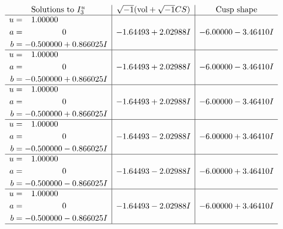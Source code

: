 \documentclass[1p]{elsarticle_modified}
\theoremstyle{definition}
\newcommand{\I}{\sqrt{-1}}
\begin{document}
$$\begin{array}{c|c|c}  
\text{Solutions to }I^u_{3}& \I (\text{vol} + \sqrt{-1}CS) & \text{Cusp shape}\\
 \hline 
\begin{aligned}
u &= \phantom{-}1.00000\phantom{ +0.000000I} \\
a &= \phantom{-0.000000 } 0 \\
b &= -0.500000 + 0.866025 I\end{aligned}
 & -1.64493 + 2.02988 I & -6.00000 - 3.46410 I \\ \hline\begin{aligned}
u &= \phantom{-}1.00000\phantom{ +0.000000I} \\
a &= \phantom{-0.000000 } 0 \\
b &= -0.500000 + 0.866025 I\end{aligned}
 & -1.64493 + 2.02988 I & -6.00000 - 3.46410 I \\ \hline\begin{aligned}
u &= \phantom{-}1.00000\phantom{ +0.000000I} \\
a &= \phantom{-0.000000 } 0 \\
b &= -0.500000 + 0.866025 I\end{aligned}
 & -1.64493 + 2.02988 I & -6.00000 - 3.46410 I \\ \hline\begin{aligned}
u &= \phantom{-}1.00000\phantom{ +0.000000I} \\
a &= \phantom{-0.000000 } 0 \\
b &= -0.500000 - 0.866025 I\end{aligned}
 & -1.64493 - 2.02988 I & -6.00000 + 3.46410 I \\ \hline\begin{aligned}
u &= \phantom{-}1.00000\phantom{ +0.000000I} \\
a &= \phantom{-0.000000 } 0 \\
b &= -0.500000 - 0.866025 I\end{aligned}
 & -1.64493 - 2.02988 I & -6.00000 + 3.46410 I \\ \hline\begin{aligned}
u &= \phantom{-}1.00000\phantom{ +0.000000I} \\
a &= \phantom{-0.000000 } 0 \\
b &= -0.500000 - 0.866025 I\end{aligned}
 & -1.64493 - 2.02988 I & -6.00000 + 3.46410 I\\
 \hline 
 \end{array}$$\newpage
\end{document}
